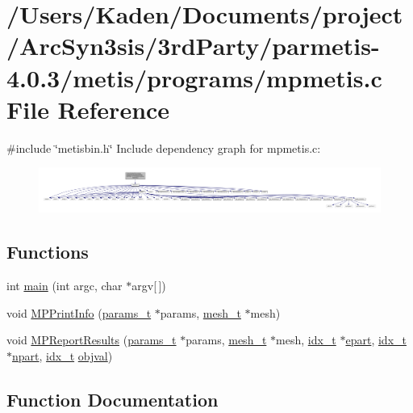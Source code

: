 \hypertarget{a00323}{}\section{/\+Users/\+Kaden/\+Documents/project/\+Arc\+Syn3sis/3rd\+Party/parmetis-\/4.0.3/metis/programs/mpmetis.c File Reference}
\label{a00323}
{\ttfamily \#include \char`\"{}metisbin.\+h\char`\"{}}\newline
Include dependency graph for mpmetis.\+c\+:\nopagebreak
\begin{figure}[H]
\begin{center}
\leavevmode
\includegraphics[width=350pt]{a00324}
\end{center}
\end{figure}
\subsection*{Functions}
\begin{DoxyCompactItemize}
\item 
int \hyperlink{a00323_a0ddf1224851353fc92bfbff6f499fa97}{main} (int argc, char $\ast$argv\mbox{[}$\,$\mbox{]})
\item 
void \hyperlink{a00323_a921bb5a29825f90d7095365cc3e92bdc}{M\+P\+Print\+Info} (\hyperlink{a00706}{params\+\_\+t} $\ast$params, \hyperlink{a00738}{mesh\+\_\+t} $\ast$mesh)
\item 
void \hyperlink{a00323_ab030933d65b9043991ac35e28a0a6df0}{M\+P\+Report\+Results} (\hyperlink{a00706}{params\+\_\+t} $\ast$params, \hyperlink{a00738}{mesh\+\_\+t} $\ast$mesh, \hyperlink{a00876_aaa5262be3e700770163401acb0150f52}{idx\+\_\+t} $\ast$\hyperlink{a00879_a3be6f43a8ac8840d4c97578068513c18}{epart}, \hyperlink{a00876_aaa5262be3e700770163401acb0150f52}{idx\+\_\+t} $\ast$\hyperlink{a00879_aa5e2883dfb3577926b3b5842698947bc}{npart}, \hyperlink{a00876_aaa5262be3e700770163401acb0150f52}{idx\+\_\+t} \hyperlink{a00879_a3cb2fc01fde2f4d088a9c5bc8da62b0a}{objval})
\end{DoxyCompactItemize}


\subsection{Function Documentation}
\mbox{\label{a00323_a0ddf1224851353fc92bfbff6f499fa97}} 
